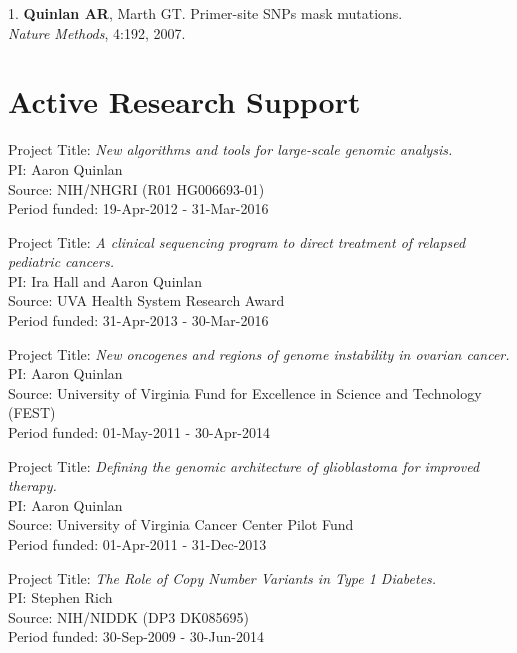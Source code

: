 \documentclass[margin,line]{cv}
\begin{document}
\begin{resume}
\begin{list}{*}{}
    \item[1.] \textbf{Quinlan AR}, Marth GT. 
    Primer-site SNPs mask mutations.\\
    \textit{Nature Methods}, 4:192, 2007.

    \end{list}

    

    \section{\mysidestyle Active Research Support}

    Project Title: \textit{New algorithms and tools for large-scale genomic analysis.} \\
    PI: Aaron Quinlan \\
    Source: NIH/NHGRI (R01 HG006693-01) \\
    Period funded: 19-Apr-2012 - 31-Mar-2016
    
    Project Title: \textit{A clinical sequencing program to direct treatment of relapsed pediatric cancers.} \\
    PI: Ira Hall and Aaron Quinlan \\
    Source: UVA Health System Research Award  \\
    Period funded: 31-Apr-2013 - 30-Mar-2016
	    
    \vspace{-2mm}
    Project Title: \textit{New oncogenes and regions of genome instability in ovarian cancer.} \\
    PI: Aaron Quinlan \\
    Source: University of Virginia Fund for Excellence in Science and Technology (FEST) \\
    Period funded: 01-May-2011 - 30-Apr-2014
    
    \vspace{-2mm}
    Project Title: \textit{Defining the genomic architecture of glioblastoma for improved therapy.} \\
    PI: Aaron Quinlan \\
    Source: University of Virginia Cancer Center Pilot Fund\\
    Period funded: 01-Apr-2011 - 31-Dec-2013

    \vspace{-2mm}
    Project Title: \textit{The Role of Copy Number Variants in Type 1 Diabetes.} \\
    PI: Stephen Rich \\
    Source: NIH/NIDDK (DP3 DK085695)\\
    Period funded: 30-Sep-2009 - 30-Jun-2014


\end{resume}
\end{document}
